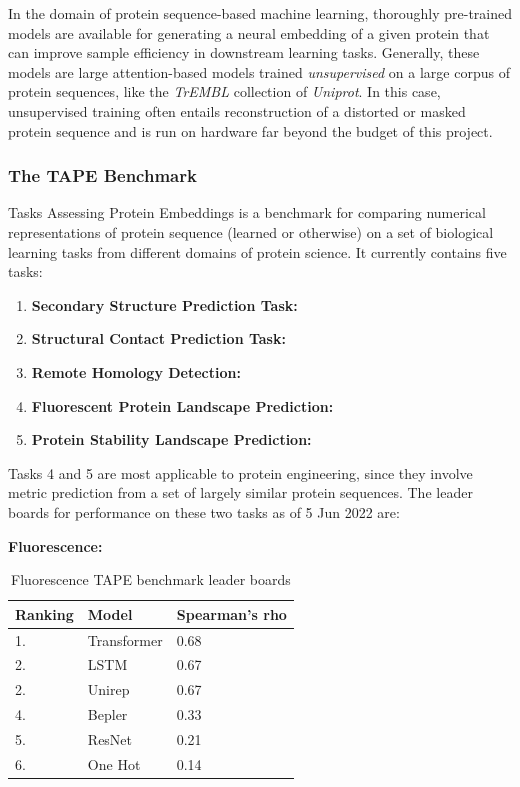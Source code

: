 \documentclass{article}
\begin{document}
In the domain of protein sequence-based machine learning, thoroughly pre-trained models are available for generating a neural embedding of a given protein that can improve sample efficiency in downstream learning tasks.
Generally, these models are large attention-based models trained \textit{unsupervised} on a large corpus of protein sequences, like the \textit{TrEMBL} collection of \textit{Uniprot}.
In this case, unsupervised training often entails reconstruction of a distorted or masked protein sequence and is run on hardware far beyond the budget of this project.

\subsubsection{The TAPE Benchmark}

Tasks Assessing Protein Embeddings \textcite{tape2019} is a benchmark for comparing numerical representations of protein sequence (learned or otherwise) on a set of biological learning tasks from different domains of protein science. 
It currently contains five tasks:

\begin{enumerate}
\item \textbf{Secondary Structure Prediction Task:}
\item \textbf{Structural Contact Prediction Task:}
\item \textbf{Remote Homology Detection:}
\item \textbf{Fluorescent Protein Landscape Prediction:}
\item \textbf{Protein Stability Landscape Prediction:}
\end{enumerate}

Tasks 4 and 5 are most applicable to protein engineering, since they involve metric prediction from a set of largely similar protein sequences.
The leader boards for performance on these two tasks as of 5 Jun 2022 are:

\textbf{Fluorescence:}

\begin{table}
	\begin{center}
		\caption{Fluorescence TAPE benchmark leader boards \label{tapefluor}}
		\begin{tabular}{l|p{3cm}|l}
			\textbf{Ranking} & \textbf{Model} & \textbf{Spearman's rho}\\
		\hline 
			 1. & Transformer & 0.68 \\
			 2. & LSTM & 0.67 \\
			 2. & Unirep & 0.67 \\
			 4. & Bepler & 0.33 \\
			 5. & ResNet & 0.21 \\
			 6. & One Hot & 0.14 \\
		\end{tabular}
	\end{center}
\end{table}
\end{document}
